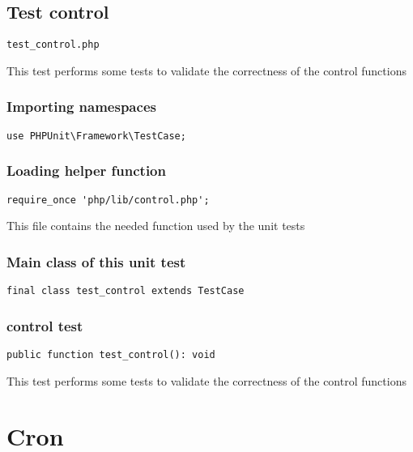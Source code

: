 \documentclass[a4paper]{article}
\begin{document}
\subsection{Test control}

\begin{lstlisting}
test_control.php
\end{lstlisting}

This test performs some tests to validate the correctness
of the control functions

\hypertarget{toc111}{}
\subsubsection{Importing namespaces}

\begin{lstlisting}
use PHPUnit\Framework\TestCase;
\end{lstlisting}

\hypertarget{toc112}{}
\subsubsection{Loading helper function}

\begin{lstlisting}
require_once 'php/lib/control.php';
\end{lstlisting}

This file contains the needed function used by the unit tests

\hypertarget{toc113}{}
\subsubsection{Main class of this unit test}

\begin{lstlisting}
final class test_control extends TestCase
\end{lstlisting}

\hypertarget{toc114}{}
\subsubsection{control test}

\begin{lstlisting}
public function test_control(): void
\end{lstlisting}

This test performs some tests to validate the correctness
of the control functions


\hypertarget{toc115}{}
\section{Cron}
\end{document}
